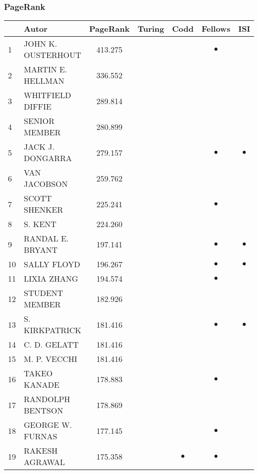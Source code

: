 \documentclass[12pt,titlepage]{report}
\begin{document}
\subsubsection{PageRank}
\begin{center}
\begin{tabular}{|l|l|c|c|c|c|c|}
\hline
& {\bf Autor} & {\bf PageRank} & {\bf Turing} & {\bf Codd} & {\bf Fellows} & {\bf ISI} \\
\hline
1  & JOHN K. OUSTERHOUT & 413.275 &         &         &$\bullet$&         \\
2  & MARTIN E. HELLMAN & 336.552  &         &         &         &         \\
3  & WHITFIELD DIFFIE & 289.814   &         &         &         &         \\
4  & SENIOR MEMBER & 280.899      &         &         &         &         \\
5  & JACK J. DONGARRA & 279.157   &         &         &$\bullet$&$\bullet$\\
6  & VAN JACOBSON & 259.762       &         &         &         &         \\
7  & SCOTT SHENKER & 225.241      &         &         &$\bullet$&         \\
8  & S. KENT & 224.260            &         &         &         &         \\
9  & RANDAL E. BRYANT & 197.141   &         &         &$\bullet$&$\bullet$\\
10 & SALLY FLOYD & 196.267        &         &         &$\bullet$&$\bullet$\\
11 & LIXIA ZHANG & 194.574        &         &         &$\bullet$&         \\
12 & STUDENT MEMBER & 182.926     &         &         &         &         \\
13 & S. KIRKPATRICK & 181.416     &         &         &$\bullet$&$\bullet$\\
14 & C. D. GELATT & 181.416       &         &         &         &         \\
15 & M. P. VECCHI & 181.416       &         &         &         &         \\
16 & TAKEO KANADE & 178.883       &         &         &$\bullet$&         \\
17 & RANDOLPH BENTSON & 178.869   &         &         &         &         \\
18 & GEORGE W. FURNAS & 177.145   &         &         &$\bullet$&         \\
19 & RAKESH AGRAWAL & 175.358     &         &$\bullet$&$\bullet$&         \\

\end{tabular}
\end{center}
\end{document}
